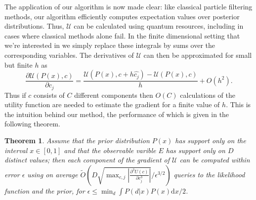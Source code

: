 \documentclass[aps,amsmath,onecolumn,amssymb]{revtex4}
\newtheorem{theorem}{Theorem}
\begin{document}
The application of our algorithm is now made clear: like classical particle
filtering methods, our algorithm efficiently computes expectation values over
posterior distributions. Thus, $\mathcal{U}$ can be calculated using quantum resources,
including in cases where classical methods alone fail.
In the finite dimensional setting that we're interested in we simply replace these integrals by sums over the corresponding variables.
The derivatives of $\mathcal{U}$ can then be approximated for small but finite $h$ as 
\begin{equation}
\frac{\partial \mathcal{U}(P(x),c)}{\partial c_j} = \frac{\mathcal{U}(P(x),c+h\hat{c_j})-\mathcal{U}(P(x),c)}{h} + O(h^2).
\end{equation}
Thus if $c$ consists of $C$ different components then $O(C)$ calculations of the utility function are needed to estimate the gradient for a finite value of $h$.
This is the intuition behind our method, the performance of which is given in the following theorem.
\begin{theorem}
Assume that the prior distribution $P(x)$ has support only on the interval $x\in [0,1]$ and that the observable varible $E$ has support only on $D$ distinct values; then each component of the gradient of $\mathcal{U}$ can be computed within error $\epsilon$ using on average $\tilde{O}\left(D\sqrt{\max_{c,j}\left|\frac{\partial^3 U(c)}{\partial c_j^3} \right|}/\epsilon^{3/2}\right)$ queries to the likelihood function and the prior, for $\epsilon \le \min_d \int P(d|x)P(x) \mathrm{d}x/2$.
\end{theorem}
\end{document}
